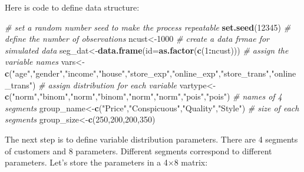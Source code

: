 \documentclass[
]{article}
\newenvironment{Shaded}{\begin{snugshade}}{\end{snugshade}}
\newcommand{\CommentTok}[1]{\textcolor[rgb]{0.56,0.35,0.01}{\textit{#1}}}
\newcommand{\DataTypeTok}[1]{\textcolor[rgb]{0.13,0.29,0.53}{#1}}
\newcommand{\DecValTok}[1]{\textcolor[rgb]{0.00,0.00,0.81}{#1}}
\newcommand{\KeywordTok}[1]{\textcolor[rgb]{0.13,0.29,0.53}{\textbf{#1}}}
\newcommand{\NormalTok}[1]{#1}
\newcommand{\OperatorTok}[1]{\textcolor[rgb]{0.81,0.36,0.00}{\textbf{#1}}}
\newcommand{\StringTok}[1]{\textcolor[rgb]{0.31,0.60,0.02}{#1}}
\begin{document}
Here is code to define data structure:

\begin{Shaded}
\begin{Highlighting}[]
\CommentTok{# set a random number seed to make the process repeatable}
\KeywordTok{set.seed}\NormalTok{(}\DecValTok{12345}\NormalTok{)}
\CommentTok{# define the number of observations}
\NormalTok{ncust<-}\DecValTok{1000}
\CommentTok{# create a data frmae for simulated data}
\NormalTok{seg_dat<-}\KeywordTok{data.frame}\NormalTok{(}\DataTypeTok{id=}\KeywordTok{as.factor}\NormalTok{(}\KeywordTok{c}\NormalTok{(}\DecValTok{1}\OperatorTok{:}\NormalTok{ncust)))}
\CommentTok{# assign the variable names}
\NormalTok{vars<-}\KeywordTok{c}\NormalTok{(}\StringTok{"age"}\NormalTok{,}\StringTok{"gender"}\NormalTok{,}\StringTok{"income"}\NormalTok{,}\StringTok{"house"}\NormalTok{,}\StringTok{"store_exp"}\NormalTok{,}\StringTok{"online_exp"}\NormalTok{,}\StringTok{"store_trans"}\NormalTok{,}\StringTok{"online_trans"}\NormalTok{)}
\CommentTok{# assign distribution for each variable}
\NormalTok{vartype<-}\KeywordTok{c}\NormalTok{(}\StringTok{"norm"}\NormalTok{,}\StringTok{"binom"}\NormalTok{,}\StringTok{"norm"}\NormalTok{,}\StringTok{"binom"}\NormalTok{,}\StringTok{"norm"}\NormalTok{,}\StringTok{"norm"}\NormalTok{,}\StringTok{"pois"}\NormalTok{,}\StringTok{"pois"}\NormalTok{)}
\CommentTok{# names of 4 segments}
\NormalTok{group_name<-}\KeywordTok{c}\NormalTok{(}\StringTok{"Price"}\NormalTok{,}\StringTok{"Conspicuous"}\NormalTok{,}\StringTok{"Quality"}\NormalTok{,}\StringTok{"Style"}\NormalTok{)}
\CommentTok{# size of each segments}
\NormalTok{group_size<-}\KeywordTok{c}\NormalTok{(}\DecValTok{250}\NormalTok{,}\DecValTok{200}\NormalTok{,}\DecValTok{200}\NormalTok{,}\DecValTok{350}\NormalTok{)}
\end{Highlighting}
\end{Shaded}

The next step is to define variable distribution parameters. There are 4
segments of customers and 8 parameters. Different segments correspond to
different parameters. Let's store the parameters in a 4×8 matrix:
\end{document}
